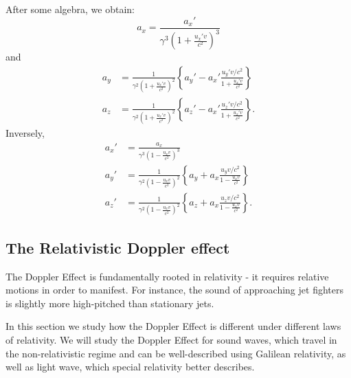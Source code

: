 \documentclass[a4paper,11pt]{article}
\numberwithin{equation}{section}
\begin{document}
 \noindent After some algebra, we obtain:
 \begin{equation}
 a_x=\frac{{a_x}'}{\gamma^3\left(1+\frac{{u_x}'v}{c^2} \right)^3}
 \end{equation}
 and
 \begin{equation}
 \begin{split}
 a_y&=\frac{1}{\gamma^2\left(1+\frac{{u_x}'v}{c^2} \right) ^2}\left\lbrace {a_y}' - {a_x}'\frac{{u_y}'v/c^2}{1+\frac{{u_x}'v}{c^2}}\right\rbrace \\
 a_z&=\frac{1}{\gamma^2\left(1+\frac{{u_x}'v}{c^2} \right) ^2}\left\lbrace {a_z}' - {a_x}'\frac{{u_z}'v/c^2}{1+\frac{{u_x}'v}{c^2}}\right\rbrace.
 \end{split}
 \end{equation}
 Inversely,
 \begin{equation}
 \begin{split}
 {a_x}'&=\frac{{a_x}}{\gamma^3\left(1-\frac{{u_x}v}{c^2} \right)^3}\\
 {a_y}'&=\frac{1}{\gamma^2\left(1-\frac{{u_x}v}{c^2} \right) ^2}\left\lbrace {a_y} + {a_x}\frac{{u_y}v/c^2}{1-\frac{{u_x}v}{c^2}}\right\rbrace \\
 {a_z}'&=\frac{1}{\gamma^2\left(1-\frac{{u_x}v}{c^2} \right) ^2}\left\lbrace {a_z} + {a_x}\frac{{u_z}v/c^2}{1-\frac{{u_x}v}{c^2}}\right\rbrace.
 \end{split}
 \end{equation}
 
 \subsection{The Relativistic Doppler effect}
 The Doppler Effect is fundamentally rooted in relativity - it requires relative motions in order to manifest. For instance, the sound of approaching jet fighters is slightly more high-pitched than stationary jets. 
 
 \noindent In this section we study how the Doppler Effect is different under different laws of relativity. We will study the Doppler Effect for sound waves, which travel in the non-relativistic regime and can be well-described using Galilean relativity, as well as light wave, which special relativity better describes. 
\end{document}
